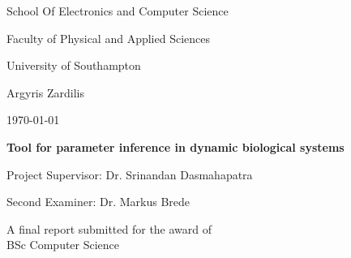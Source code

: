 \begin{titlepage}
    \let\footnotesize\small
    \let\footnoterule\relax
    \let \footnote \thanks
    \setcounter{footnote}{0}
    \begin{center}
      \setlength{\parskip}{0pt}
       {\large School Of Electronics and Computer Science \par}
      {\large Faculty of Physical and Applied Sciences \par}
      {\large University of Southampton \par}
      \vspace{29mm}
      {\large Argyris Zardilis \par}	
	\vspace{4mm}
      \large \today
	\vspace{13mm}
        \center
        {\Large \bf Tool for parameter inference in dynamic biological systems \par}
        \vspace{60mm}
      {\large Project Supervisor: Dr. Srinandan Dasmahapatra \par }
      {\large Second Examiner: Dr. Markus Brede \par}
      \vspace{12mm}
        {\large A final report submitted for the award of }\\
      {\large BSc Computer Science }
    \end{center}
  \end{titlepage}